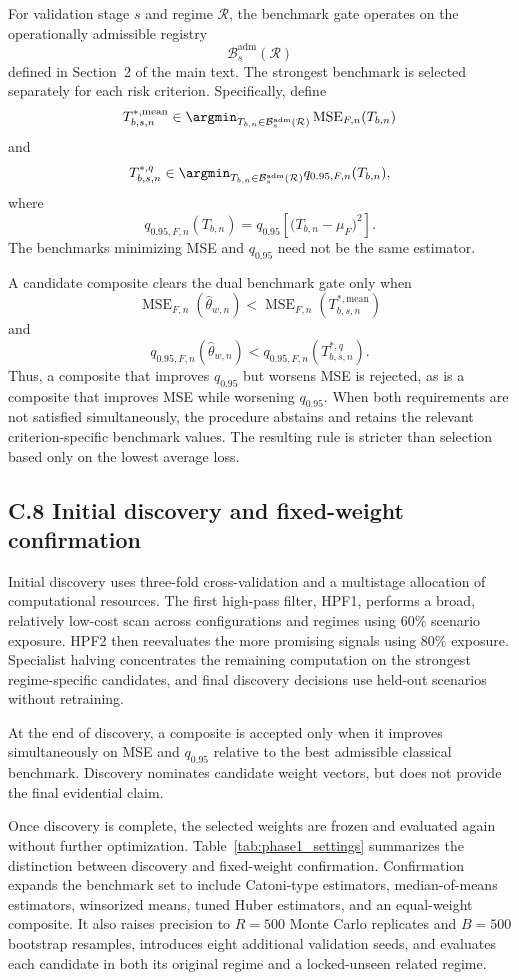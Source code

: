 For validation stage \(s\) and regime \(\mathcal{R}\), the benchmark gate operates on the operationally admissible registry
\[
\mathcal{B}^{\mathrm{adm}}_s(\mathcal{R})
\]
defined in Section~2 of the main text. The strongest benchmark is selected separately for each risk criterion. Specifically, define
\[
T^{*,\mathrm{mean}}_{b,s,n}
\in
\argmin_{T_{b,n}\in\mathcal{B}^{\mathrm{adm}}_s(\mathcal{R})}
\operatorname{MSE}_{F,n}(T_{b,n})
\]
and
\[
T^{*,q}_{b,s,n}
\in
\argmin_{T_{b,n}\in\mathcal{B}^{\mathrm{adm}}_s(\mathcal{R})}
q_{0.95,F,n}(T_{b,n}),
\]
where
\[
q_{0.95,F,n}(T_{b,n})
=
q_{0.95}
\left[
\bigl(T_{b,n}-\mu_F\bigr)^2
\right].
\]
The benchmarks minimizing MSE and \(q_{0.95}\) need not be the same estimator.

A candidate composite clears the dual benchmark gate only when
\[
\operatorname{MSE}_{F,n}(\widehat{\theta}_{w,n})
<
\operatorname{MSE}_{F,n}
\left(T^{*,\mathrm{mean}}_{b,s,n}\right)
\]
and
\[
q_{0.95,F,n}(\widehat{\theta}_{w,n})
<
q_{0.95,F,n}
\left(T^{*,q}_{b,s,n}\right).
\]
Thus, a composite that improves \(q_{0.95}\) but worsens MSE is rejected, as is a composite that improves MSE while worsening \(q_{0.95}\). When both requirements are not satisfied simultaneously, the procedure abstains and retains the relevant criterion-specific benchmark values. The resulting rule is stricter than selection based only on the lowest average loss.

\subsection*{C.8 Initial discovery and fixed-weight confirmation}
Initial discovery uses three-fold cross-validation and a multistage allocation of computational resources. The first high-pass filter, HPF1, performs a broad, relatively low-cost scan across configurations and regimes using 60\% scenario exposure. HPF2 then reevaluates the more promising signals using 80\% exposure. Specialist halving concentrates the remaining computation on the strongest regime-specific candidates, and final discovery decisions use held-out scenarios without retraining.

At the end of discovery, a composite is accepted only when it improves simultaneously on MSE and $q_{0.95}$ relative to the best admissible classical benchmark. Discovery nominates candidate weight vectors, but does not provide the final evidential claim.

Once discovery is complete, the selected weights are frozen and evaluated again without further optimization. Table~\ref{tab:phase1_settings} summarizes the distinction between discovery and fixed-weight confirmation. Confirmation expands the benchmark set to include Catoni-type estimators, median-of-means estimators, winsorized means, tuned Huber estimators, and an equal-weight composite. It also raises precision to $R=500$ Monte Carlo replicates and $B=500$ bootstrap resamples, introduces eight additional validation seeds, and evaluates each candidate in both its original regime and a locked-unseen related regime.

